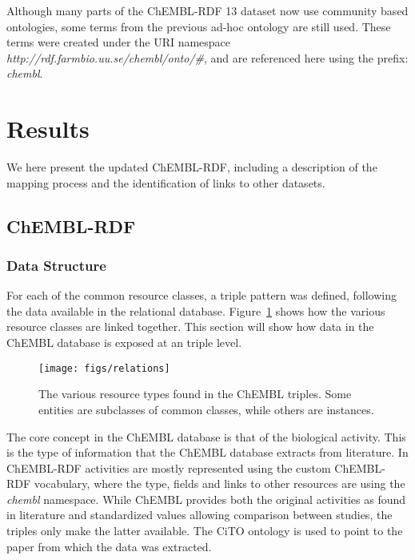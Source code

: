 \documentclass[sw]{iosart2c}
\begin{document}
Although many parts of the ChEMBL-RDF 13 dataset now use community based ontologies, some 
terms from the previous ad-hoc ontology are still used. These terms were created under the 
URI namespace \textit{http://rdf.farmbio.uu.se/chembl/onto/\#}, and are referenced here using the
prefix: \textit{chembl}.


\section{Results}\label{s3}

We here present the updated ChEMBL-RDF, including a description of the mapping process 
and the identification of links to other datasets.

\subsection{ChEMBL-RDF}

\subsubsection{Data Structure}

For each of the common resource classes, a triple pattern was defined, following the
data available in the relational database. Figure~\ref{f1} shows how the various resource
classes are linked together. This section will show how data in the ChEMBL database
is exposed at an triple level.

\begin{figure}[t]
\texttt{[image: figs/relations]}
\caption{The various resource types found in the ChEMBL triples. Some entities are subclasses
of common classes, while others are instances.}\label{f1}
\end{figure}

The core concept in the ChEMBL database is that of the biological activity. This
is the type of information that the ChEMBL database extracts from literature.
In ChEMBL-RDF activities are mostly represented using the custom ChEMBL-RDF vocabulary, where the
type, fields and links to other resources are using the \textit{chembl}
namespace. While ChEMBL provides both the original activities as found in literature
and standardized values allowing comparison between studies, the triples only
make the latter available. The CiTO ontology is used to point to the paper from
which the data was extracted.
\end{document}
